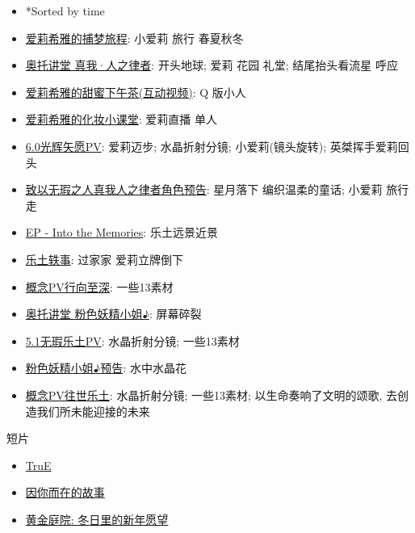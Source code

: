 \documentclass[a4paper]{article}
\begin{document}
\begin{itemize}
    \item *Sorted by time
    \item \href{https://www.bilibili.com/video/BV1ZW4y1t7Zf/}{爱莉希雅的捕梦旅程}: 小爱莉 旅行 春夏秋冬
    \item \href{https://www.bilibili.com/video/BV1q14y147EC/}{奥托讲堂 真我·人之律者}: 开头地球; 爱莉 花园 礼堂; 结尾抬头看流星 呼应
    \item \href{https://www.bilibili.com/video/BV1Ta411Z7KE/}{爱莉希雅的甜蜜下午茶(互动视频)}: Q 版小人
    \item \href{https://www.bilibili.com/video/BV12T411w7CN/}{爱莉希雅的化妆小课堂}: 爱莉直播 单人
    \item \href{https://www.bilibili.com/video/BV1Mg411k7U5/}{6.0光辉矢愿PV}: 爱莉迈步; 水晶折射分镜; 小爱莉(镜头旋转); 英桀挥手爱莉回头
    \item \href{https://www.bilibili.com/video/BV1DS4y1t7rs/}{致以无瑕之人真我人之律者角色预告}: 星月落下 编织温柔的童话; 小爱莉 旅行 走
    \item \href{https://www.bilibili.com/video/BV18Y4y1Y7Hc/}{EP - Into the Memories}: 乐土远景近景
    \item \href{https://www.bilibili.com/video/BV1fr4y1n787/}{乐土轶事}: 过家家 爱莉立牌倒下
    \item \href{https://www.bilibili.com/video/BV1wF411b7wo/}{概念PV行向至深}: 一些13素材
    \item \href{https://www.bilibili.com/video/BV1Ny4y1573D/}{奥托讲堂 粉色妖精小姐♪}: 屏幕碎裂
    \item \href{https://www.bilibili.com/video/BV1iP4y1W7Kk/}{5.1无瑕乐土PV}: 水晶折射分镜; 一些13素材
    \item \href{https://www.bilibili.com/video/BV1Nw411R7bU/}{粉色妖精小姐♪预告}: 水中水晶花
    \item \href{https://www.bilibili.com/video/BV1T64y1X7mY/}{概念PV往世乐土}: 水晶折射分镜; 一些13素材; 以生命奏响了文明的颂歌, 去创造我们所未能迎接的未来
\end{itemize}

短片

\begin{itemize}
    \item \href{https://www.bilibili.com/video/BV1sg411y7cZ/}{TruE}
    \item \href{https://www.bilibili.com/video/BV1fY4y1F7GL/}{因你而在的故事}
    \item \href{https://www.bilibili.com/video/BV1oA411o7zD/}{黄金庭院: 冬日里的新年愿望}
\end{itemize}
\end{document}
